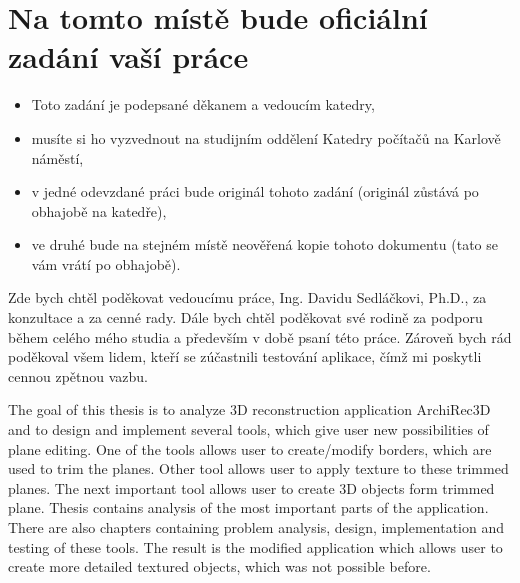 \documentclass[11pt,twoside,a4paper]{book}
\begin{document}
	
	\translate				%

	{
	 \cleardoublepage \thispagestyle{empty}
	\chapter*{Na tomto místě bude oficiální zadání vaší práce}
	\begin{itemize}
		\item Toto zadání je podepsané děkanem a vedoucím katedry,
		\item musíte si ho vyzvednout na studijním oddělení Katedry počítačů na Karlově náměstí,
		\item v jedné odevzdané práci bude originál tohoto zadání (originál zůstává po obhajobě na katedře),
		\item ve druhé bude na stejném místě neověřená kopie tohoto dokumentu (tato se vám vrátí po obhajobě).
	\end{itemize}
	\newpage
	}

	\coverpagestarts


	\acknowledgements
	\noindent
	Zde bych chtěl poděkovat vedoucímu práce, Ing. Davidu Sedláčkovi, Ph.D., za konzultace a za cenné rady. Dále bych chtěl poděkovat své rodině za podporu během celého mého studia a především v době psaní této práce. Zároveň bych rád poděkoval všem lidem, kteří se zúčastnili testování aplikace, čímž mi poskytli cennou zpětnou vazbu.



 
	\abstractpage
	\noindent
	The goal of this thesis is to analyze 3D reconstruction application ArchiRec3D and to design and implement several tools, which give user new possibilities of plane editing. 
	One of the tools allows user to create/modify borders, which are used to trim the planes. Other tool allows user to apply texture to these trimmed planes. The next important tool allows user to create 3D objects form trimmed plane. 
	Thesis contains analysis of the most important parts of the application. There are also chapters containing problem analysis, design, implementation and testing of these tools.
	The result is the modified application which allows user to create more detailed textured objects, which was not possible before.
\end{document}
